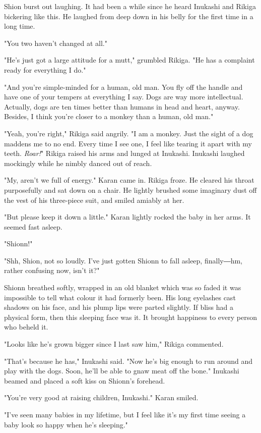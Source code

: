 Shion burst out laughing. It had been a while since he heard Inukashi
and Rikiga bickering like this. He laughed from deep down in his belly
for the first time in a long time.

"You two haven't changed at all."

"He's just got a large attitude for a mutt," grumbled Rikiga. "He has a
complaint ready for everything I do."

"And you're simple-minded for a human, old man. You fly off the handle
and have one of your tempers at everything I say. Dogs are way more
intellectual. Actually, dogs are ten times better than humans in head
and heart, anyway. Besides, I think you're closer to a monkey than a
human, old man."

"Yeah, you're right," Rikiga said angrily. "I am a monkey. Just the
sight of a dog maddens me to no end. Every time I see one, I feel like
tearing it apart with my teeth. \emph{Roar!}" Rikiga raised his arms and lunged
at Inukashi. Inukashi laughed mockingly while he nimbly danced out of
reach.

"My, aren't we full of energy." Karan came in. Rikiga froze. He cleared
his throat purposefully and sat down on a chair. He lightly brushed some
imaginary dust off the vest of his three-piece suit, and smiled amiably
at her.

"But please keep it down a little." Karan lightly rocked the baby in her
arms. It seemed fast asleep.

"Shionn!"

"Shh, Shion, not so loudly. I've just gotten Shionn to fall asleep,
finally―hm, rather confusing now, isn't it?"

Shionn breathed softly, wrapped in an old blanket which was so faded it
was impossible to tell what colour it had formerly been. His long
eyelashes cast shadows on his face, and his plump lips were parted
slightly. If bliss had a physical form, then this sleeping face was it.
It brought happiness to every person who beheld it.

"Looks like he's grown bigger since I last saw him," Rikiga commented.

"That's because he has," Inukashi said. "Now he's big enough to run
around and play with the dogs. Soon, he'll be able to gnaw meat off the
bone." Inukashi beamed and placed a soft kiss on Shionn's forehead.

"You're very good at raising children, Inukashi." Karan smiled.~

"I've seen many babies in my lifetime, but I feel like it's my first
time seeing a baby look so happy when he's sleeping."

